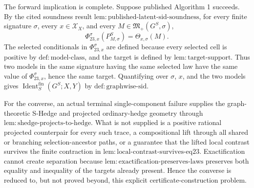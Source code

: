 The forward implication is complete.  Suppose published Algorithm 1 succeeds.  By the cited soundness result \(\mathrm{lem:published\text{-}latent\text{-}sid\text{-}soundness}\), for every finite signature \(\sigma\), every \(x\in\mathcal X_X\), and every \(M\in\mathfrak M_+(G^S,\sigma)\),
\[
 \Phi_{23,x}^{\sigma}(P_{M,\sigma}^S)
 =\Theta_{x,\sigma}(M).
\]
The selected conditionals in \(\Phi_{23,x}^{\sigma}\) are defined because every selected cell is positive by \(\mathrm{def:model\text{-}class}\), and the target is defined by \(\mathrm{lem:target\text{-}support}\).  Thus two models in the same signature having the same selected law have the same value of \(\Phi_{23,x}^{\sigma}\), hence the same target.  Quantifying over \(\sigma\), \(x\), and the two models gives \(\operatorname{Ident}^{\mathrm{fin}}_S(G^S;X,Y)\) by \(\mathrm{def:graphwise\text{-}sid}\).

For the converse, an actual terminal single-component failure supplies the graph-theoretic S-Hedge and projected ordinary-hedge geometry through \(\mathrm{lem:shedge\text{-}projects\text{-}to\text{-}hedge}\).  What is not supplied is a positive rational projected counterpair for every such trace, a compositional lift through all shared or branching selection-ancestor paths, or a guarantee that the lifted local contrast survives the finite contraction in \(\mathrm{lem:local\text{-}contrast\text{-}survives\text{-}eq23}\).  Exactification cannot create separation because \(\mathrm{lem:exactification\text{-}preserves\text{-}laws}\) preserves both equality and inequality of the targets already present.  Hence the converse is reduced to, but not proved beyond, this explicit certificate-construction problem.